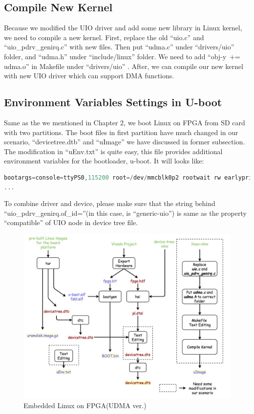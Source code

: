 \subsection{Compile New Kernel}
\label{subsec:Compile New Kernel}
Because we modified the UIO driver and add some new library in Linux kernel, we need to compile a new kernel. First, replace the old ``uio.c'' and ``uio\_pdrv\_genirq.c'' with new files. Then put ``udma.c'' under ``drivers/uio'' folder, and ``udma.h'' under ``include/linux'' folder. We need to add ``obj-y\  += udma.o'' in Makefile under ``drivers/uio'' . After, we can compile our new kernel with new UIO driver which can support DMA functions.

\subsection{Environment Variables Settings in U-boot}
\label{subsec:Linux On FPGA}
Same as the we mentioned in Chapter 2, we boot Linux on FPGA from SD card with two partitions. The boot files in first partition have much changed in our scenario, ``devicetree.dtb'' and ``uImage'' we have discussed in former subsection. The modification in ``uEnv.txt'' is quite easy, this file provides additional environment variables for the bootloader, u-boot. It will looks like: 

{\renewcommand\baselinestretch{0.8}\selectfont
\begin{lstlisting}[frame=single,language=C]
bootargs=console=ttyPS0,115200 root=/dev/mmcblk0p2 rootwait rw earlyprintk uio_pdrv_genirq.of_id=genric-uio
...
\end{lstlisting}
\par}
To combine driver and device, please make sure that the string behind ``uio\_pdrv\_genirq.of\_id=''(in this case, is ``generic-uio'') is same as the property ``compatible'' of UIO node in device tree file.

\begin{figure}[!htb]
  \centering
  \includegraphics[scale=0.4]{images/new_embedded_linux.jpg}
  \caption[Embedded Linux on FPGA(UDMA ver.)]{Embedded Linux on FPGA(UDMA ver.)}
  \label{fig:Embedded Linux on FPGA(UDMA ver.)}
\end{figure}

